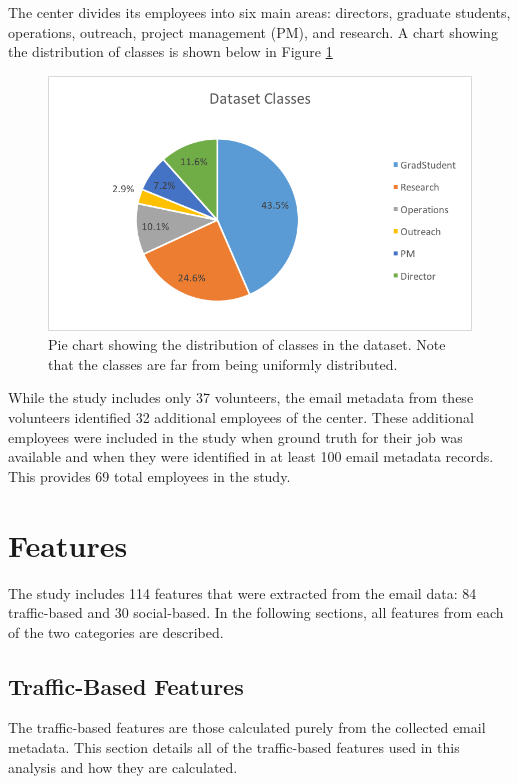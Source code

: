 \documentclass[12pt]{report}
\begin{document}
The center divides its employees into six main areas: directors, graduate students, operations, outreach, project management (PM), and research. 
A chart showing the distribution of classes is shown below in Figure \ref{fig:class_breakdown}
\begin{figure}[t]
    \centering
        \includegraphics[width=\columnwidth,trim={1mm 8mm 1mm 2mm},clip]{class_breakdown}
        \caption[Dataset class distribution pie chart]{Pie chart showing the distribution of classes in the dataset.  Note that the classes are far from being uniformly distributed.}
        \label{fig:class_breakdown}
\end{figure}


While the study includes only 37 volunteers, the email metadata from these volunteers identified 32 additional employees of the center.
These additional employees were included in the study when ground truth for their job was available and when they were identified in at least 100 email metadata records.
This provides 69 total employees in the study.

\section{Features}
The study includes 114 features that were extracted from the email data: 84 traffic-based and 30 social-based.
In the following sections, all features from each of the two categories are described. 

\subsection{Traffic-Based Features}
The traffic-based features are those calculated purely from the collected email metadata.
This section details all of the traffic-based features used in this analysis and how they are calculated. 
\end{document}
